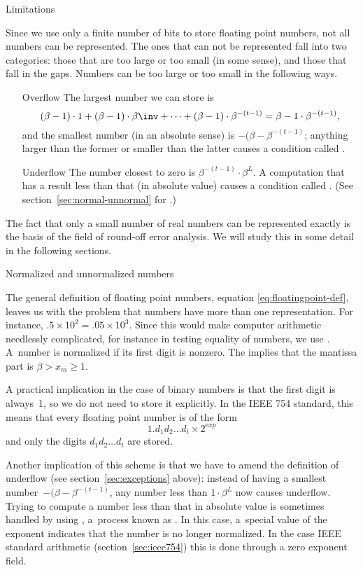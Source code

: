 
 {Limitations}
\label{sec:exceptions}

Since we use only a finite number of bits to store floating point
numbers, not all numbers can be represented. The ones that can not be
represented fall into two categories: those that are too large or too
small (in some sense), and those that fall in the gaps. Numbers can be
too large or too small in the following ways.
\begin{itemize}
\item[Overflow] The largest number we can store is
  \[ (\beta-1)\cdot1+(\beta-1)\cdot\beta\inv+\cdots
  +(\beta-1)\cdot\beta^{-(t-1)}=\beta-1\cdot\beta^{-(t-1)},
  \]
  and the smallest number (in an absolute
  sense) is $-(\beta-\beta^{-(t-1)}$; anything larger than the
  former or smaller than the latter causes a condition called
  .
\item[Underflow]The number closest to zero is $\beta^{-(t-1)}\cdot
  \beta^L$. A computation that has a result less than that (in
  absolute value) causes a condition called . 
  (See section~\ref{sec:normal-unnormal} 
  for .)
\end{itemize}
The fact that only a small number of real numbers can be represented
exactly is the basis of the field of round-off error analysis. We will
study this in some detail in the following sections.

 {Normalized and unnormalized numbers}
\label{sec:normal-unnormal}

The general definition of floating point numbers,
equation \eqref{eq:floatingpoint-def}, leaves us with the problem that numbers
have more than one representation. For instance,
$.5\times10^{2}=.05\times 10^3$. Since this would make computer
arithmetic needlessly complicated, for instance in testing equality of
numbers, we use . A~number is normalized if its first digit is nonzero.
The implies that the mantissa part is $\beta> x_m\geq 1$.

A practical implication in the case of binary numbers is that the
first digit is always~1, so we do not need to store it explicitly.
In the IEEE 754 standard, this means that every floating point number
is of the form
\[ 1.d_1d_2\ldots d_t\times 2^{\mathrm exp}\]
and only the digits $d_1d_2\ldots d_t$ are stored.

Another implication of this scheme is that we have to amend the
definition of underflow (see section~\ref{sec:exceptions} above):
instead of having a smallest number~$-(\beta-\beta^{-(t-1)}$,
any number less than $1\cdot\beta^L$ now causes underflow. Trying
  to compute a number less than that in absolute value is sometimes
  handled by using ,
  a~process known as . In this case, a~special
value of the exponent indicates that the number is no longer normalized.
In the case IEEE standard arithmetic (section~\ref{sec:ieee754})
this is done through a zero exponent field.

